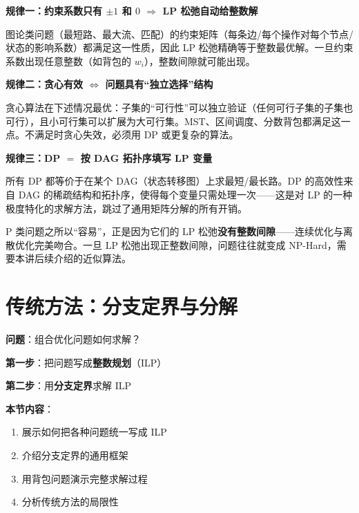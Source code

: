 \documentclass[12pt, a4paper]{ctexart}
\begin{document}
\begin{blackboard}[三条核心规律]

\textbf{规律一：约束系数只有 $\pm 1$ 和 $0$ $\Rightarrow$ LP 松弛自动给整数解}

图论类问题（最短路、最大流、匹配）的约束矩阵（每条边/每个操作对每个节点/状态的影响系数）都满足这一性质，因此 LP 松弛精确等于整数最优解。一旦约束系数出现任意整数（如背包的 $w_i$），整数间隙就可能出现。

\textbf{规律二：贪心有效 $\Leftrightarrow$ 问题具有``独立选择''结构}

贪心算法在下述情况最优：子集的``可行性''可以独立验证（任何可行子集的子集也可行），且小可行集可以扩展为大可行集。MST、区间调度、分数背包都满足这一点。不满足时贪心失效，必须用 DP 或更复杂的算法。

\textbf{规律三：DP $=$ 按 DAG 拓扑序填写 LP 变量}

所有 DP 都等价于在某个 DAG（状态转移图）上求最短/最长路。DP 的高效性来自 DAG 的稀疏结构和拓扑序，使得每个变量只需处理一次——这是对 LP 的一种极度特化的求解方法，跳过了通用矩阵分解的所有开销。

\begin{insight}[P vs NP 的凸优化本质]
P 类问题之所以``容易''，正是因为它们的 LP 松弛\textbf{没有整数间隙}——连续优化与离散优化完美吻合。一旦 LP 松弛出现正整数间隙，问题往往就变成 NP-Hard，需要本讲后续介绍的近似算法。
\end{insight}

\end{blackboard}

\section{传统方法：分支定界与分解}

\begin{blackboard}[本节目标]

\textbf{问题}：组合优化问题如何求解？

\textbf{第一步}：把问题写成\textbf{整数规划}（ILP）

\textbf{第二步}：用\textbf{分支定界}求解 ILP

\textbf{本节内容}：
\begin{enumerate}
    \item 展示如何把各种问题统一写成 ILP
    \item 介绍分支定界的通用框架
    \item 用背包问题演示完整求解过程
    \item 分析传统方法的局限性
\end{enumerate}

\end{blackboard}
\end{document}
